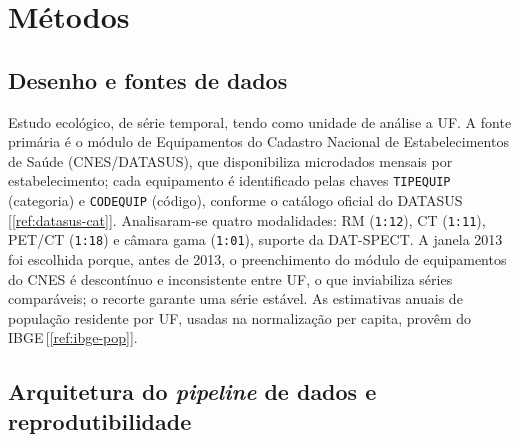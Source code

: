 \documentclass[12pt,a4paper,oneside]{article}
\begin{document}
\section{Métodos}

\subsection{Desenho e fontes de dados}

Estudo ecológico, de série temporal, tendo como unidade de análise a
UF. A fonte primária é o módulo de Equipamentos do Cadastro Nacional
de Estabelecimentos de Saúde (CNES/DATASUS), que disponibiliza
microdados mensais por estabelecimento; cada equipamento é
identificado pelas chaves \texttt{TIPEQUIP} (categoria) e
\texttt{CODEQUIP} (código), conforme o catálogo oficial do
DATASUS\,[\ref{ref:datasus-cat}]. Analisaram-se quatro modalidades:
RM (\texttt{1:12}), CT (\texttt{1:11}), PET/CT (\texttt{1:18}) e câmara
gama (\texttt{1:01}), suporte da DAT-SPECT. A janela 2013
foi escolhida porque, antes de 2013, o preenchimento do módulo de
equipamentos do CNES é descontínuo e inconsistente entre UF, o que
inviabiliza séries comparáveis; o recorte garante uma série estável.
As estimativas anuais de população residente por UF, usadas na
normalização per capita, provêm do IBGE\,[\ref{ref:ibge-pop}].

\subsection{Arquitetura do \textit{pipeline} de dados e
reprodutibilidade}
\end{document}
